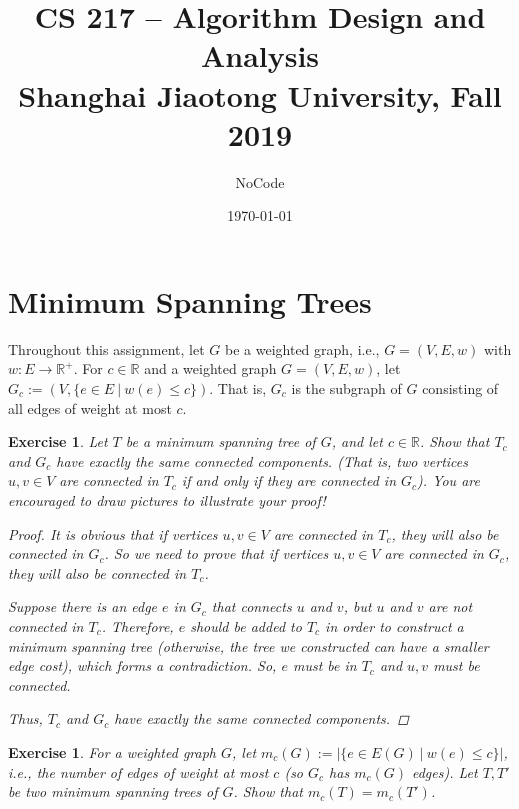 \documentclass[12pt,a4]{article}
\newcommand{\R}{\mathbb{R}}
\newtheorem{exercise}[theorem]{Exercise}
\begin{document}
\date{\today}
\author{NoCode}

\title{CS 217 -- Algorithm Design and Analysis \\ 
  \vspace{3mm}
    {\large	Shanghai Jiaotong University, Fall 2019\\}
}

\maketitle

\noindent
\setcounter{section}{2}

\section{Minimum Spanning Trees}

Throughout this assignment, let $G$ be a weighted graph, i.e., $G=(V,E,w)$ 
with $w: E \rightarrow \R^+$.
For $c \in \R$ and a weighted graph $G = (V,E,w)$, let
  $G_c := (V, \{e \in E \ | \ w(e) \leq c\})$. That is, $G_c$ is the
  subgraph of $G$ consisting of all edges of weight at most $c$.


\begin{exercise}
  Let $T$ be a minimum spanning tree of $G$, and let $c \in \R$.  Show that
  $T_c$ and $G_c$ have exactly the same connected components.  (That
  is, two vertices $u,v \in V$ are connected in $T_c$ if and only if
  they are connected in $G_c$).
  You are encouraged to draw pictures to illustrate your proof!
  
\begin{proof}
    It is obvious that if vertices $u,v\in V$ are connected in $T_c$, they will also be connected in $G_c$. So we need to prove that if vertices $u,v\in V$ are connected in $G_c$, they will also be connected in $T_c$.

    Suppose there is an edge $e$ in $G_c$ that connects $u$ and $v$, but $u$ and $v$ are not connected in $T_c$. Therefore, $e$ should be added to $T_c$ in order to construct a minimum spanning tree (otherwise, the tree we constructed can have a smaller edge cost), which forms a contradiction. So, $e$ must be in $T_c$ and $u,v$ must be connected.

    Thus, $T_c$ and $G_c$ have exactly the same connected components.
\end{proof}
  
\end{exercise}

\begin{exercise}
  For a weighted graph $G$, let $m_c(G) := | \{ e \in E(G) \ | \ w(e) \leq c\}|$, i.e.,
  the number of edges of weight at most $c$ (so $G_c$ has $m_c(G)$ edges).
  Let $T, T'$ be two minimum spanning trees of $G$. Show that
  $m_c(T) = m_c(T')$.
\end{exercise}
\end{document}
